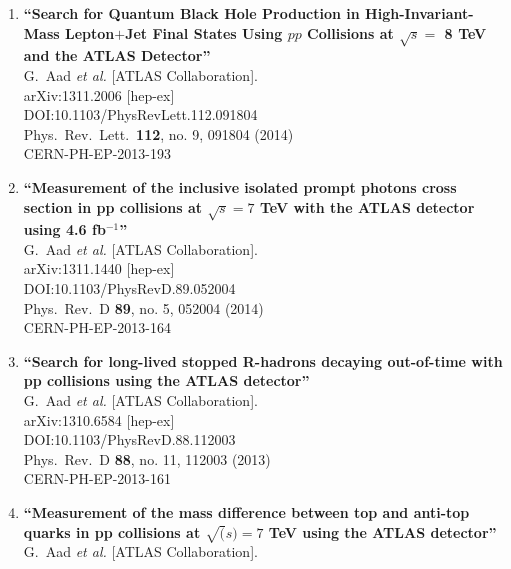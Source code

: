 \documentclass{article}
\begin{document}
\begin{enumerate}
\item%
{\bf ``Search for Quantum Black Hole Production in High-Invariant-Mass Lepton$+$Jet Final States Using $pp$ Collisions at $\sqrt{s} =$ 8  TeV and the ATLAS Detector''}
  \\{}G.~Aad {\it et al.} [ATLAS Collaboration].
  \\{}arXiv:1311.2006 [hep-ex]
  \\{}DOI:10.1103/PhysRevLett.112.091804
  \\{}Phys.\ Rev.\ Lett.\  {\bf 112}, no. 9, 091804 (2014)
  \\{}CERN-PH-EP-2013-193
\item%
{\bf ``Measurement of the inclusive isolated prompt photons cross section in pp collisions at $\sqrt{s}=7$  TeV with the ATLAS detector using 4.6  fb$^{−1}$''}
  \\{}G.~Aad {\it et al.} [ATLAS Collaboration].
  \\{}arXiv:1311.1440 [hep-ex]
  \\{}DOI:10.1103/PhysRevD.89.052004
  \\{}Phys.\ Rev.\ D {\bf 89}, no. 5, 052004 (2014)
  \\{}CERN-PH-EP-2013-164
\item%
{\bf ``Search for long-lived stopped R-hadrons decaying out-of-time with pp collisions using the ATLAS detector''}
  \\{}G.~Aad {\it et al.} [ATLAS Collaboration].
  \\{}arXiv:1310.6584 [hep-ex]
  \\{}DOI:10.1103/PhysRevD.88.112003
  \\{}Phys.\ Rev.\ D {\bf 88}, no. 11, 112003 (2013)
  \\{}CERN-PH-EP-2013-161
\item%
{\bf ``Measurement of the mass difference between top and anti-top quarks in pp collisions at $\sqrt(s) = 7$ TeV using the ATLAS detector''}
  \\{}G.~Aad {\it et al.} [ATLAS Collaboration].

\end{enumerate}
\end{document}
